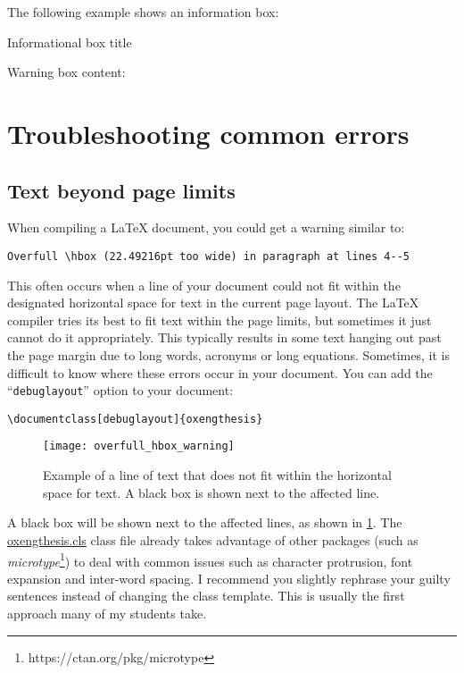 The following example shows an information box:

\begin{OxInfoBox}{Informational box title}

Warning box content: \lipsum[1]

\end{OxInfoBox}


\section{Troubleshooting common errors}


\subsection{Text beyond page limits}


When compiling a LaTeX document, you could get a warning similar to:


\begin{lstlisting}[style=custom-text]
Overfull \hbox (22.49216pt too wide) in paragraph at lines 4--5
\end{lstlisting}


This often occurs when a line of your document could not fit within the designated horizontal space for text in the current page layout. The LaTeX compiler tries its best to fit text within the page limits, but sometimes it just cannot do it appropriately. This typically results in some text hanging out past the page margin due to long words, acronyms or long equations. Sometimes, it is difficult to know where these errors occur in your document. You can add the ``\verb|debuglayout|'' option to your document:


\begin{lstlisting}[style=custom-latex]
\documentclass[debuglayout]{oxengthesis}
\end{lstlisting}


\begin{figure}[htb]
    \centering
    \texttt{[image: overfull\_hbox\_warning]}
    \caption[Example of a line of text that does not fit within the horizontal space for text]
    {
        Example of a line of text that does not fit within the horizontal space for text. A black box is shown next to the affected line.
        \label{fig:ch0:overfull_hbox_warning}
    }
\end{figure}


A black box will be shown next to the affected lines, as shown in \cref{fig:ch0:overfull_hbox_warning}. The \url{oxengthesis.cls} class file already takes advantage of other packages (such as
\textit{microtype}\footnote{https://ctan.org/pkg/microtype}) to deal with common issues such as character protrusion, font expansion and inter-word spacing. I recommend you slightly rephrase your guilty sentences instead of changing the class template. This is usually the first approach many of my students take.


